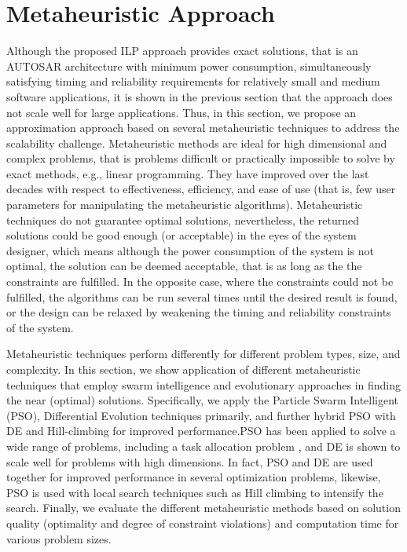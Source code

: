 \section{Metaheuristic Approach}
Although the proposed ILP approach provides exact solutions, that is an AUTOSAR architecture with minimum power consumption, simultaneously satisfying timing and reliability requirements for relatively small and medium software applications, it is shown in the previous section that the approach does not scale well for large applications. Thus, in this section, we propose an approximation approach based on several metaheuristic techniques to address the scalability challenge. Metaheuristic methods are ideal for high dimensional and complex problems, that is problems difficult or practically impossible to solve by exact methods, e.g., linear programming. They have improved over the last decades with respect to effectiveness, efficiency, and ease of use (that is, few user parameters for manipulating the metaheuristic algorithms). Metaheuristic techniques do not guarantee optimal solutions, nevertheless, the returned solutions could be good enough (or acceptable) in the eyes of the system designer, which means although the power consumption of the system is not optimal, the solution can be deemed acceptable, that is as long as the the constraints are fulfilled. In the opposite case, where the constraints could not be fulfilled, the algorithms can be run several times until the desired result is found, or the design can be relaxed by weakening the timing and reliability constraints of the system.

Metaheuristic techniques perform differently for different problem types, size, and complexity. In this section, we show application of different metaheuristic techniques that employ swarm intelligence and evolutionary approaches in finding the near (optimal) solutions. Specifically, we apply the Particle Swarm Intelligent (PSO), Differential Evolution techniques primarily, and further hybrid PSO with DE and Hill-climbing for improved performance.PSO has been applied to solve a wide range of problems, including a task allocation problem \cite{yin2007task}, and DE is shown to scale well for problems with high dimensions. In fact, PSO and DE are used together for improved performance in several optimization problems, likewise, PSO is used with local search techniques such as Hill climbing to intensify the search. Finally, we evaluate the different metaheuristic methods based on solution quality (optimality and degree of constraint violations) and computation time for various problem sizes.

